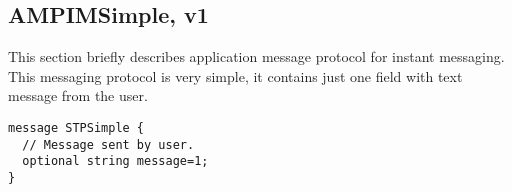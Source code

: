 \documentclass[a4paper,10pt]{article}
\begin{document}
\subsection{AMPIMSimple, v1}
This section briefly describes application message protocol for instant messaging. This messaging protocol is very simple,
it contains just one field with text message from the user.

\begin{Verbatim}[frame=single]
message STPSimple {
  // Message sent by user.
  optional string message=1;
}
\end{Verbatim} 
\end{document}
